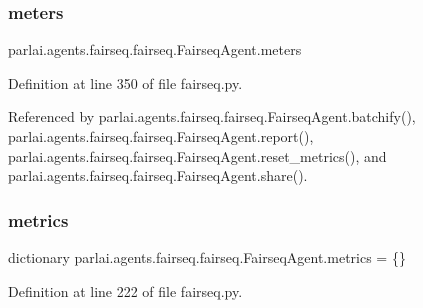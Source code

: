 \subsubsection{\texorpdfstring{meters}{meters}}
{\footnotesize\ttfamily parlai.\+agents.\+fairseq.\+fairseq.\+Fairseq\+Agent.\+meters}



Definition at line 350 of file fairseq.\+py.



Referenced by parlai.\+agents.\+fairseq.\+fairseq.\+Fairseq\+Agent.\+batchify(), parlai.\+agents.\+fairseq.\+fairseq.\+Fairseq\+Agent.\+report(), parlai.\+agents.\+fairseq.\+fairseq.\+Fairseq\+Agent.\+reset\+\_\+metrics(), and parlai.\+agents.\+fairseq.\+fairseq.\+Fairseq\+Agent.\+share().

\mbox{\label{classparlai_1_1agents_1_1fairseq_1_1fairseq_1_1FairseqAgent_a5e71f6ef265d5463a4fb1e561853edd6}} 
\subsubsection{\texorpdfstring{metrics}{metrics}}
{\footnotesize\ttfamily dictionary parlai.\+agents.\+fairseq.\+fairseq.\+Fairseq\+Agent.\+metrics = \{\}\hspace{0.3cm}{\ttfamily [static]}}



Definition at line 222 of file fairseq.\+py.



